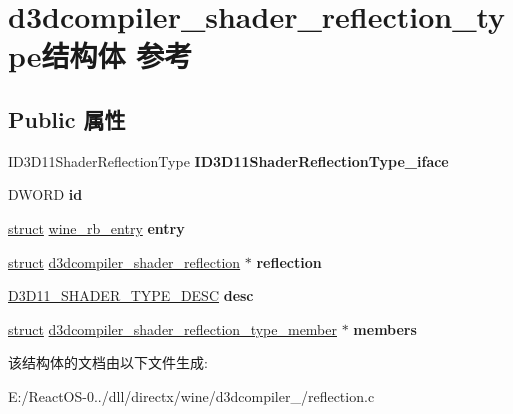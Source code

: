 \hypertarget{structd3dcompiler__shader__reflection__type}{}\section{d3dcompiler\+\_\+shader\+\_\+reflection\+\_\+type结构体 参考}
\label{structd3dcompiler__shader__reflection__type}
\subsection*{Public 属性}
\begin{DoxyCompactItemize}
\item 
\mbox{\label{structd3dcompiler__shader__reflection__type_a80781aa86ad896e369542beeb4924c63}} 
I\+D3\+D11\+Shader\+Reflection\+Type {\bfseries I\+D3\+D11\+Shader\+Reflection\+Type\+\_\+iface}
\item 
\mbox{\label{structd3dcompiler__shader__reflection__type_a1684b0ef71f0fdf4eb3eac01e56cd103}} 
D\+W\+O\+RD {\bfseries id}
\item 
\mbox{\label{structd3dcompiler__shader__reflection__type_a07bcc44a0fe9889834d81d50d4c3c731}} 
\hyperlink{interfacestruct}{struct} \hyperlink{structwine__rb__entry}{wine\+\_\+rb\+\_\+entry} {\bfseries entry}
\item 
\mbox{\label{structd3dcompiler__shader__reflection__type_aa736140429344c8b25625200adfc71f2}} 
\hyperlink{interfacestruct}{struct} \hyperlink{structd3dcompiler__shader__reflection}{d3dcompiler\+\_\+shader\+\_\+reflection} $\ast$ {\bfseries reflection}
\item 
\mbox{\label{structd3dcompiler__shader__reflection__type_a98124e9a94a979ad6994263d86267ff5}} 
\hyperlink{struct___d3_d11___s_h_a_d_e_r___t_y_p_e___d_e_s_c}{D3\+D11\+\_\+\+S\+H\+A\+D\+E\+R\+\_\+\+T\+Y\+P\+E\+\_\+\+D\+E\+SC} {\bfseries desc}
\item 
\mbox{\label{structd3dcompiler__shader__reflection__type_ac68e7c7ed190c001e002b93d231f3597}} 
\hyperlink{interfacestruct}{struct} \hyperlink{structd3dcompiler__shader__reflection__type__member}{d3dcompiler\+\_\+shader\+\_\+reflection\+\_\+type\+\_\+member} $\ast$ {\bfseries members}
\end{DoxyCompactItemize}


该结构体的文档由以下文件生成\+:\begin{DoxyCompactItemize}
\item 
E\+:/\+React\+O\+S-\/0../dll/directx/wine/d3dcompiler\+\_/reflection.\+c\end{DoxyCompactItemize}
